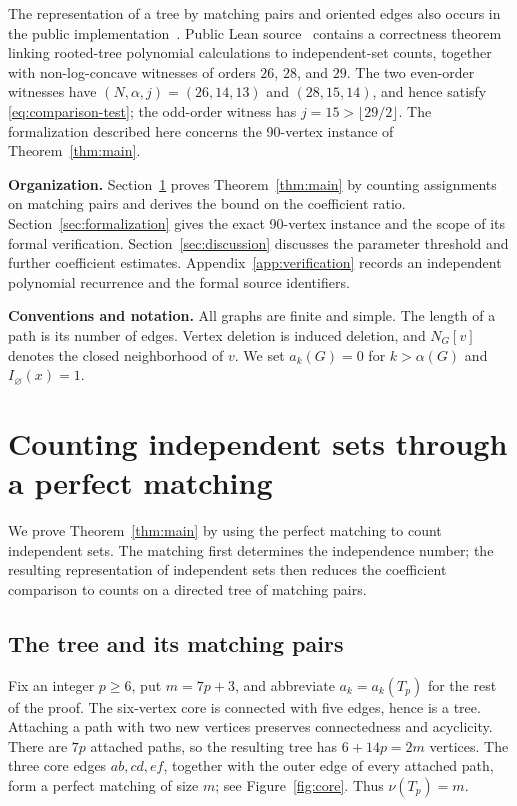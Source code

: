 \documentclass[11pt,a4paper]{article}
\theoremstyle{remark}
\numberwithin{equation}{section}
\begin{document}
The representation of a tree by matching pairs and oriented edges
also occurs in the public implementation~\cite{MatchingLift}.
Public Lean source~\cite{LeanWitnesses} contains a correctness theorem
linking rooted-tree polynomial calculations to independent-set
counts, together with non-log-concave witnesses of orders $26$, $28$,
and $29$. The two even-order witnesses have
$(N,\alpha,j)=(26,14,13)$ and $(28,15,14)$, and hence satisfy
\eqref{eq:comparison-test}; the odd-order witness has
$j=15>\lfloor29/2\rfloor$.
The formalization described here concerns the 90-vertex instance of
Theorem~\ref{thm:main}.

\noindent\textbf{Organization.}
Section~\ref{sec:proofs} proves Theorem~\ref{thm:main} by counting
assignments on matching pairs and derives the bound on the coefficient
ratio. Section~\ref{sec:formalization} gives the exact 90-vertex
instance and the scope of its formal verification.
Section~\ref{sec:discussion} discusses the parameter threshold and
further coefficient estimates. Appendix~\ref{app:verification}
records an independent polynomial recurrence and the formal source
identifiers.

\noindent\textbf{Conventions and notation.}
All graphs are finite and simple. The length of a path is its number
of edges. Vertex deletion is induced deletion, and $N_G[v]$ denotes
the closed neighborhood of $v$. We set $a_k(G)=0$ for
$k>\alpha(G)$ and $I_{\varnothing}(x)=1$.

\section{Counting independent sets through a perfect matching}\label{sec:proofs}

We prove Theorem~\ref{thm:main} by using the perfect matching to count
independent sets. The matching first determines the independence number;
the resulting representation of independent sets then reduces the
coefficient comparison to counts on a directed tree of matching pairs.

\subsection{The tree and its matching pairs}\label{sec:construction}

Fix an integer $p\geq6$, put $m=7p+3$, and abbreviate
$a_k=a_k(T_p)$ for the rest of the proof.
The six-vertex core is connected with five edges, hence is a tree.
Attaching a path with two new vertices preserves connectedness and
acyclicity. There are $7p$ attached paths, so the resulting tree has
$6+14p=2m$ vertices. The three core edges $ab,cd,ef$, together with
the outer edge of every attached path, form a perfect matching of
size $m$; see Figure~\ref{fig:core}. Thus $\nu(T_p)=m$.
\end{document}
